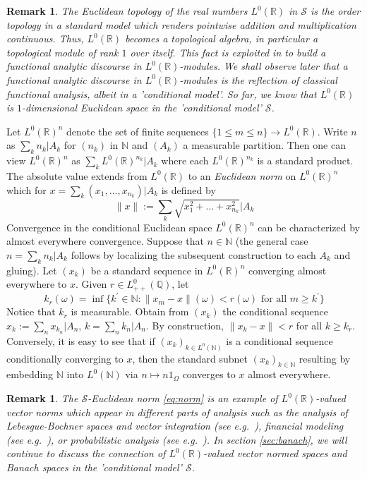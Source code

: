 \documentclass{jloganal}
\numberwithin{equation}{section}
\theoremstyle{plain}
\newtheorem{remark}[subsection]{Remark}
\renewcommand{\leq}{\leqslant}
\renewcommand{\geq}{\geqslant}
\renewcommand\R{\mathbb{R}}
\newcommand\N{\mathbb{N}}
\begin{document}
\begin{remark}\label{r:realline}
The Euclidean topology of the real numbers $L^0(\mathbb{R})$ in $\mathcal{S}$ is the order topology in a standard model which renders pointwise addition and multiplication continuous. 
Thus, $L^0(\mathbb{R})$ becomes a topological algebra, in particular a topological module of rank $1$ over itself. 
This fact is exploited in \cite{filipovic2009separation,cheridito2015conditional,drapeau2016algebra,jamneshan2017compact} to build a functional analytic discourse in $L^0(\mathbb{R})$-modules. 
We shall observe later that a functional analytic discourse in $L^0(\mathbb{R})$-modules is the reflection of classical functional analysis, albeit in a 'conditional model'.  
So far, we know that $L^0(\mathbb{R})$ is $1$-dimensional Euclidean space in the 'conditional model' $\mathcal{S}$. 
\end{remark}
Let $L^0(\mathbb{R})^n$ denote the set of finite sequences $\{1\leq m \leq n\}\to L^0(\mathbb{R})$.  
Write $n$ as $\sum_k n_k|A_k$ for $(n_k)$ in $\mathbb{N}$ and $(A_k)$ a measurable partition. 
Then one can view $L^0(\mathbb{R})^n$ as $\sum_k L^0(\mathbb{R})^{n_k}|A_k$ where each $L^0(\mathbb{R})^{n_k}$ is a standard product. 
The absolute value extends from $L^0(\mathbb{R})$ to an \emph{Euclidean norm} on $L^0(\mathbb{R})^n$ which for $x=\sum_k (x_1,\ldots,x_{n_k})|A_k$ is defined by  
\begin{equation}\label{eq:norm}
\|x\|:=\sum_k \sqrt{x_1^2+\ldots+x_{n_k}^2}\bigg|A_k
\end{equation}
Convergence in the conditional Euclidean space $L^0(\mathbb{R})^n$ can be characterized by almost everywhere convergence. 
Suppose that $n\in \mathbb{N}$ (the general case $n=\sum_k n_k|A_k$ follows by localizing the subsequent construction to each $A_k$ and gluing).   
Let $(x_k)$ be a standard sequence in $L^0(\mathbb{R})^n$ converging almost everywhere to $x$. 
Given $r\in L^0_{++}(\mathbb{Q})$, let
\[
k_r(\omega)=\inf\{k^\prime\in \N\colon \|x_m -x\|(\omega)< r(\omega) \text{ for all } m \geq k^\prime\}
\]
Notice that $k_r$ is measurable. 
Obtain from $(x_k)$ the conditional sequence $x_k:=\sum_n x_{k_n}|A_n$, $k=\sum_n k_n|A_n$. 
By construction, $\|x_k-x\|<r$ for all $k\geq k_r$.  
Conversely, it is easy to see that if $(x_k)_{k\in L^0(\N)}$ is a conditional sequence conditionally converging to $x$, 
then the standard subnet $(x_k)_{k\in \N}$ resulting by embedding $\N$ into $L^0(\N)$ via $n\mapsto n 1_\Omega$ converges to $x$ almost everywhere.   
\begin{remark}\label{r:euclidean}
The $\mathcal{S}$-Euclidean norm \eqref{eq:norm} is an example of $L^0(\R)$-valued vector norms which appear in different parts of analysis such as the analysis of Lebesgue-Bochner spaces and vector integration (see e.g.~\cite{joseph1977vector,haydon1991randomly,hytoenen2016analysis}),  financial modeling (see e.g.~\cite{hansen1987role,filipovic2012approaches,cheridito2016equilibrium}), or probabilistic analysis (see e.g.~\cite{guo2010relations,haydon1991randomly}).  
In section \ref{sec:banach}, we will continue to discuss the connection of $L^0(\R)$-valued vector normed spaces and Banach spaces in the 'conditional model' $\mathcal{S}$.   
\end{remark}
\end{document}

